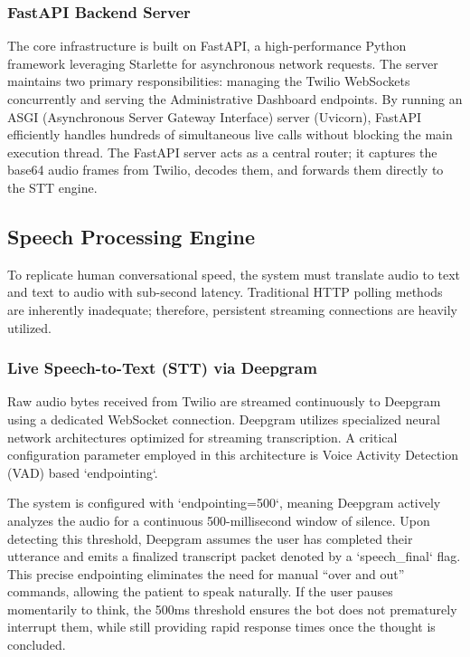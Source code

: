 \documentclass[conference,a4paper]{IEEEtran}
\begin{document}
\subsubsection{FastAPI Backend Server}
The core infrastructure is built on FastAPI, a high-performance Python framework leveraging Starlette for asynchronous network requests. The server maintains two primary responsibilities: managing the Twilio WebSockets concurrently and serving the Administrative Dashboard endpoints. By running an ASGI (Asynchronous Server Gateway Interface) server (Uvicorn), FastAPI efficiently handles hundreds of simultaneous live calls without blocking the main execution thread. The FastAPI server acts as a central router; it captures the base64 audio frames from Twilio, decodes them, and forwards them directly to the STT engine.

\subsection{Speech Processing Engine}
To replicate human conversational speed, the system must translate audio to text and text to audio with sub-second latency. Traditional HTTP polling methods are inherently inadequate; therefore, persistent streaming connections are heavily utilized.

\subsubsection{Live Speech-to-Text (STT) via Deepgram}
Raw audio bytes received from Twilio are streamed continuously to Deepgram using a dedicated WebSocket connection. Deepgram utilizes specialized neural network architectures optimized for streaming transcription. A critical configuration parameter employed in this architecture is Voice Activity Detection (VAD) based `endpointing`. 

The system is configured with `endpointing=500`, meaning Deepgram actively analyzes the audio for a continuous 500-millisecond window of silence. Upon detecting this threshold, Deepgram assumes the user has completed their utterance and emits a finalized transcript packet denoted by a `speech_final` flag. This precise endpointing eliminates the need for manual ``over and out'' commands, allowing the patient to speak naturally. If the user pauses momentarily to think, the 500ms threshold ensures the bot does not prematurely interrupt them, while still providing rapid response times once the thought is concluded.
\end{document}
